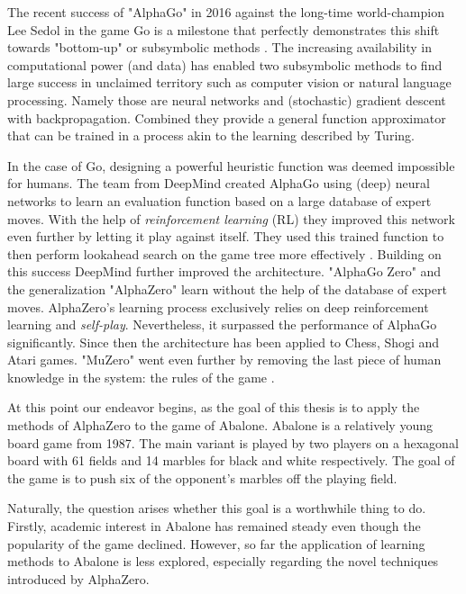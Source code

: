 The recent success of "AlphaGo" in 2016 against the long-time world-champion Lee Sedol \cite{deepmind_match_nodate} in the game Go is a milestone that perfectly demonstrates this shift towards "bottom-up" or subsymbolic methods \cite{nilsson_artificial_1998}. The increasing availability in computational power (and data) has enabled two subsymbolic methods to find large success in unclaimed territory such as computer vision or natural language processing. Namely those are neural networks and (stochastic) gradient descent with backpropagation. Combined they provide a general function approximator that can be trained in a process akin to the learning described by Turing.

In the case of Go, designing a powerful heuristic function was deemed impossible for humans. The team from DeepMind created AlphaGo using (deep) neural networks to learn an evaluation function based on a large database of expert moves. With the help of \textit{reinforcement learning} (RL) they improved this network even further by letting it play against itself. They used this trained function to then perform lookahead search on the game tree more effectively \cite{silver_mastering_2017}. Building on this success DeepMind further improved the architecture. "AlphaGo Zero" and the generalization "AlphaZero" learn without the help of the database of expert moves. AlphaZero's learning process exclusively relies on deep reinforcement learning and \textit{self-play}. Nevertheless, it surpassed the performance of AlphaGo significantly. Since then the architecture has been applied to Chess, Shogi and Atari games. "MuZero" went even further by removing the last piece of human knowledge in the system: the rules of the game \cite{schrittwieser_mastering_2020}.

At this point our endeavor begins, as the goal of this thesis is to apply the methods of AlphaZero to the game of Abalone. Abalone is a relatively young board game from 1987. The main variant is played by two players on a hexagonal board with 61 fields and 14 marbles for black and white respectively. The goal of the game is to push six of the opponent's marbles off the playing field.

Naturally, the question arises whether this goal is a worthwhile thing to do. Firstly, academic interest in Abalone has remained steady even though the popularity of the game declined. However, so far the application of learning methods to Abalone is less explored, especially regarding the novel techniques introduced by AlphaZero.

